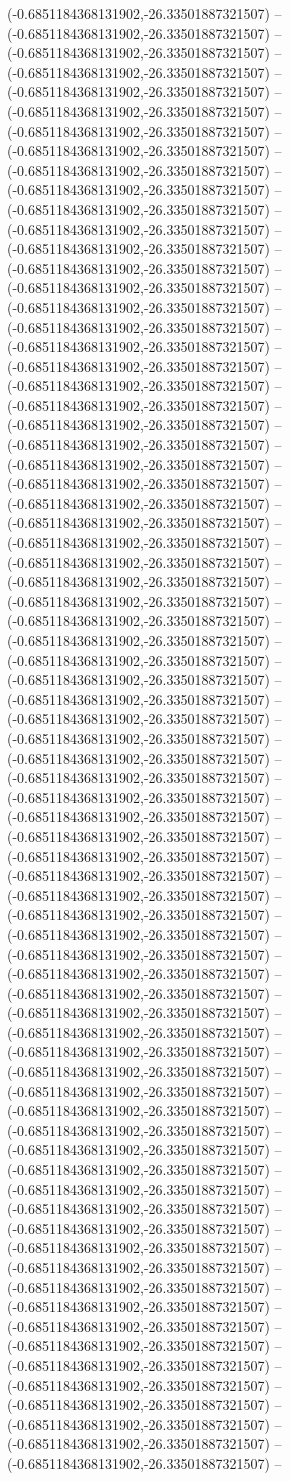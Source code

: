 (-0.6851184368131902,-26.33501887321507) -- (-0.6851184368131902,-26.33501887321507) -- (-0.6851184368131902,-26.33501887321507) -- (-0.6851184368131902,-26.33501887321507) -- (-0.6851184368131902,-26.33501887321507) -- (-0.6851184368131902,-26.33501887321507) -- (-0.6851184368131902,-26.33501887321507) -- (-0.6851184368131902,-26.33501887321507) -- (-0.6851184368131902,-26.33501887321507) -- (-0.6851184368131902,-26.33501887321507) -- (-0.6851184368131902,-26.33501887321507) -- (-0.6851184368131902,-26.33501887321507) -- (-0.6851184368131902,-26.33501887321507) -- (-0.6851184368131902,-26.33501887321507) -- (-0.6851184368131902,-26.33501887321507) -- (-0.6851184368131902,-26.33501887321507) -- (-0.6851184368131902,-26.33501887321507) -- (-0.6851184368131902,-26.33501887321507) -- (-0.6851184368131902,-26.33501887321507) -- (-0.6851184368131902,-26.33501887321507) -- (-0.6851184368131902,-26.33501887321507) -- (-0.6851184368131902,-26.33501887321507) -- (-0.6851184368131902,-26.33501887321507) -- (-0.6851184368131902,-26.33501887321507) -- (-0.6851184368131902,-26.33501887321507) -- (-0.6851184368131902,-26.33501887321507) -- (-0.6851184368131902,-26.33501887321507) -- (-0.6851184368131902,-26.33501887321507) -- (-0.6851184368131902,-26.33501887321507) -- (-0.6851184368131902,-26.33501887321507) -- (-0.6851184368131902,-26.33501887321507) -- (-0.6851184368131902,-26.33501887321507) -- (-0.6851184368131902,-26.33501887321507) -- (-0.6851184368131902,-26.33501887321507) -- (-0.6851184368131902,-26.33501887321507) -- (-0.6851184368131902,-26.33501887321507) -- (-0.6851184368131902,-26.33501887321507) -- (-0.6851184368131902,-26.33501887321507) -- (-0.6851184368131902,-26.33501887321507) -- (-0.6851184368131902,-26.33501887321507) -- (-0.6851184368131902,-26.33501887321507) -- (-0.6851184368131902,-26.33501887321507) -- (-0.6851184368131902,-26.33501887321507) -- (-0.6851184368131902,-26.33501887321507) -- (-0.6851184368131902,-26.33501887321507) -- (-0.6851184368131902,-26.33501887321507) -- (-0.6851184368131902,-26.33501887321507) -- (-0.6851184368131902,-26.33501887321507) -- (-0.6851184368131902,-26.33501887321507) -- (-0.6851184368131902,-26.33501887321507) -- (-0.6851184368131902,-26.33501887321507) -- (-0.6851184368131902,-26.33501887321507) -- (-0.6851184368131902,-26.33501887321507) -- (-0.6851184368131902,-26.33501887321507) -- (-0.6851184368131902,-26.33501887321507) -- (-0.6851184368131902,-26.33501887321507) -- (-0.6851184368131902,-26.33501887321507) -- (-0.6851184368131902,-26.33501887321507) -- (-0.6851184368131902,-26.33501887321507) -- (-0.6851184368131902,-26.33501887321507) -- (-0.6851184368131902,-26.33501887321507) -- (-0.6851184368131902,-26.33501887321507) -- (-0.6851184368131902,-26.33501887321507) -- (-0.6851184368131902,-26.33501887321507) -- (-0.6851184368131902,-26.33501887321507) -- (-0.6851184368131902,-26.33501887321507) -- (-0.6851184368131902,-26.33501887321507) -- (-0.6851184368131902,-26.33501887321507) -- (-0.6851184368131902,-26.33501887321507) -- (-0.6851184368131902,-26.33501887321507) -- (-0.6851184368131902,-26.33501887321507) -- (-0.6851184368131902,-26.33501887321507) -- (-0.6851184368131902,-26.33501887321507) -- (-0.6851184368131902,-26.33501887321507) -- (-0.6851184368131902,-26.33501887321507) -- 